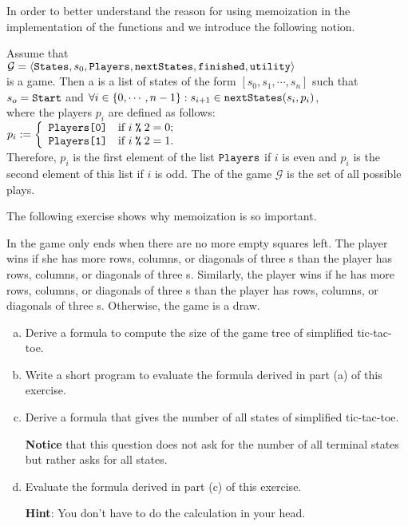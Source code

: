 In order to better understand the reason for using memoization in the implementation of the functions
 and  we introduce the following notion.
\begin{Definition}
  Assume that
  \\[0.2cm]
  \hspace*{1.3cm}
  $\mathcal{G} = \langle \texttt{States}, s_0, \texttt{Players}, \texttt{nextStates}, \texttt{finished},\texttt{utility} \rangle$
  \\[0.2cm]
  is a game. Then a  is a list of states of the form 
  $[s_0, s_1, \cdots, s_n]$ \quad such that
  \\[0.2cm]
  \hspace*{1.3cm} $s_o = \texttt{Start}$ \quad and \quad $\forall i\in\{0,\cdots,n-1\}: s_{i+1} \in \texttt{nextStates}(s_i, p_i)$,
  \\[0.2cm]
  where the players $p_i$ are defined as follows:
  \\[0.2cm]
  \hspace*{1.3cm}
  $p_i := \left\{
  \begin{array}[c]{ll}
    \texttt{Players[0]} & \mbox{if $i \;\texttt{\%}\; 2 = 0$;} \\
    \texttt{Players[1]} & \mbox{if $i \;\texttt{\%}\; 2 = 1$.}
  \end{array}
  \right.
  $
  \\[0.2cm]
  Therefore,  $p_i$ is the first element of the list $\texttt{Players}$ if $i$ is even and
  $p_i$ is the second element of this list if $i$ is odd.  The  of the game $\mathcal{G}$ is the set of all
  possible plays.  \eoxs 
\end{Definition}

\noindent
The following exercise shows why memoization is so important.

\exercise
In  the game only ends when there are no more empty squares left.
The player  wins if she has more rows, columns, or diagonals of three s than the player
 has rows, columns, or diagonals of three s.  Similarly, the player  wins
if he has more rows, columns, or diagonals of three s than the player  has rows, columns,
or diagonals of three s.  Otherwise, the game is a draw. 
\begin{enumerate}[(a)]
\item Derive a formula to compute the size of the game tree of simplified tic-tac-toe.
\item Write a short program to evaluate the formula derived in part (a) of this exercise.
\item Derive a formula that gives the number of all states of simplified tic-tac-toe.  

      \textbf{Notice} that this question does not ask for the number of all terminal states but rather asks for
      all states. 
\item Evaluate the formula derived in part (c) of this exercise.
      
      \textbf{Hint}: You don't have to do the calculation in your head.
      \eox
\end{enumerate}

